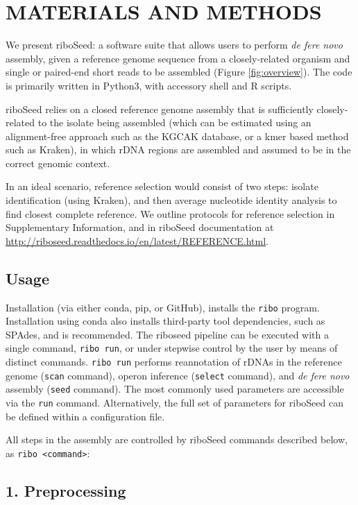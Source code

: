 \documentclass[a4,center,fleqn]{NAR}
\begin{document}
\section{MATERIALS AND METHODS}
We present riboSeed: a software suite that allows users to perform \textit{de fere novo} assembly, given a reference genome sequence from a closely-related organism and single or paired-end short reads to be assembled (Figure \ref{fig:overview}). The code is primarily written in Python3, with accessory shell and R scripts.


riboSeed relies on a closed reference genome assembly that is sufficiently closely-related to the isolate being assembled (which can be estimated using an alignment-free approach such as the KGCAK database\cite{Wang2015b}, or a kmer based method such as Kraken\cite{Wood2014}), in which rDNA regions are assembled and assumed to be in the correct genomic context.

In an ideal scenario, reference selection would consist of two steps:  isolate identification (using Kraken), and then average nucleotide identity analysis to find closest complete reference. We outline protocols for reference selection in Supplementary Information, and in riboSeed documentation at \url{http://riboseed.readthedocs.io/en/latest/REFERENCE.html}.

\subsection*{Usage}
Installation (via either conda, pip, or GitHub), installs the \texttt{ribo} program. Installation using conda also installs third-party tool dependencies, such as SPAdes, and is recommended. The riboseed pipeline can be executed with a single command, \texttt{ribo run}, or under stepwise control by the user by means of distinct commands. \texttt{ribo run} performs reannotation of rDNAs in the reference genome (\texttt{scan} command), operon inference (\texttt{select} command), and \textit{de fere novo} assembly (\texttt{seed} command).  The most commonly used parameters are accessible via the \texttt{run} command. Alternatively, the full set of parameters for riboSeed can be defined within a configuration file.

All steps in the assembly are controlled by riboSeed commands described below, as \texttt{ribo <command>}:

\subsection*{1. Preprocessing}
\end{document}
